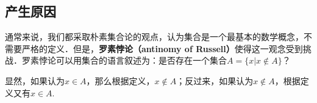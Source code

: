 \begin{issues}
\issueTODO
\end{issues}


\subsection{产生原因}
通常来说，我们都采取朴素集合论的观点，认为集合是一个最基本的数学概念，不需要严格的定义．但是，\textbf{罗素悖论（antinomy of Russell）}使得这一观念受到挑战．罗素悖论可以用集合的语言叙述为：是否存在一个集合$A=\{x|x\notin A\}$？

显然，如果认为$x\in A$，那么根据定义，$x\notin A$；反过来，如果认为$x\notin A$，根据定义又有$x\in A$.